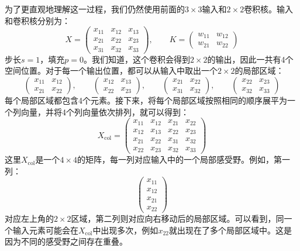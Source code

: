 为了更直观地理解这一过程，我们仍然使用前面的$3\times3$输入和$2\times2$卷积核。输入和卷积核分别为：
$$
X=\begin{pmatrix}
x_{11}&x_{12}&x_{13}\\
x_{21}&x_{22}&x_{23}\\
x_{31}&x_{32}&x_{33}
\end{pmatrix}, \qquad
K=\begin{pmatrix}
w_{11}&w_{12}\\
w_{21}&w_{22}
\end{pmatrix}
$$
步长$s=1$，填充$p=0$。我们知道，这个卷积会得到$2\times2$的输出，因此一共有4个空间位置。对于每一个输出位置，都可以从输入中取出一个$2\times2$的局部区域：
$$
\begin{pmatrix}
x_{11}&x_{12}\\
x_{21}&x_{22}
\end{pmatrix},
\qquad
\begin{pmatrix}
x_{12}&x_{13}\\
x_{22}&x_{23}
\end{pmatrix},
\qquad
\begin{pmatrix}
x_{21}&x_{22}\\
x_{31}&x_{32}
\end{pmatrix},
\qquad
\begin{pmatrix}
x_{22}&x_{23}\\
x_{32}&x_{33}
\end{pmatrix}
$$
每个局部区域都包含4个元素。接下来，将每个局部区域按照相同的顺序展平为一个列向量，并将4个列向量依次排列，就可以得到：
$$
X_{\mathrm{col}}=\begin{pmatrix}
x_{11}&x_{12}&x_{21}&x_{22}\\
x_{12}&x_{13}&x_{22}&x_{23}\\
x_{21}&x_{22}&x_{31}&x_{32}\\
x_{22}&x_{23}&x_{32}&x_{33}
\end{pmatrix}
$$
这里$X_{\mathrm{col}}$是一个$4\times4$的矩阵，每一列对应输入中的一个局部感受野。例如，第一列：
$$
\begin{pmatrix}
x_{11}\\
x_{12}\\
x_{21}\\
x_{22}
\end{pmatrix}
$$
对应左上角的$2\times2$区域，第二列则对应向右移动后的局部区域。可以看到，同一个输入元素可能会在$X_{\mathrm{col}}$中出现多次，例如$x_{22}$就出现在了多个局部区域中。这是因为不同的感受野之间存在重叠。

